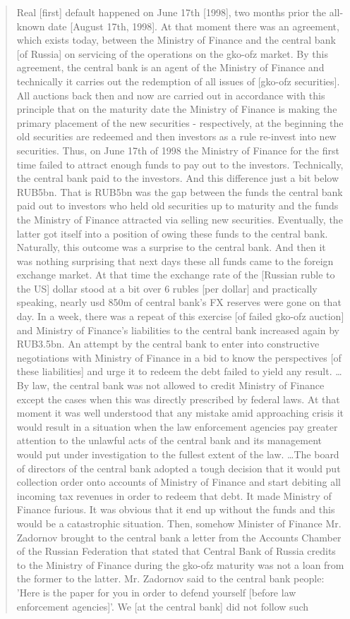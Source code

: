 \begin{quote}
Real [first] default happened on June 17th [1998], two months prior the all-known date [August 17th, 1998]. At that moment there was an agreement, which exists today, between the Ministry of Finance and the central bank [of Russia] on servicing of the operations on the \ac{gko}-\ac{ofz} market. By this agreement, the central bank is an agent of the Ministry of Finance and technically it carries out the redemption of all issues of [\ac{gko}-\ac{ofz} securities]. All auctions back then and now are carried out in accordance with this principle that on the maturity date the Ministry of Finance is making the primary placement of the new securities - respectively, at the beginning the old securities are redeemed and then investors as a rule re-invest into new securities. Thus, on June 17th of 1998 the Ministry of Finance for the first time failed to attract enough funds to pay out to the investors. Technically, the central bank paid to the investors. And this difference just a bit below RUB5bn. That is RUB5bn was the gap between the funds the central bank paid out to investors who held old securities up to maturity and the funds the Ministry of Finance attracted via selling new securities. Eventually, the latter got itself into a position of owing these funds to the central bank. Naturally, this outcome was a surprise to the central bank. And then it was nothing surprising that next days these all funds came to the foreign exchange market. At that time the exchange rate of the [Russian ruble to the US] dollar stood at a bit over 6 rubles [per dollar] and practically speaking, nearly \ac{usd} 850m of central bank's FX reserves were gone on that day. In a week, there was a repeat of this exercise [of failed \ac{gko}-\ac{ofz} auction] and Ministry of Finance's liabilities to the central bank increased again by RUB3.5bn. An attempt by the central bank to enter into constructive negotiations with Ministry of Finance in a bid to know the perspectives [of these liabilities] and urge it to redeem the debt failed to yield any result. \dots By law, the central bank was not allowed to credit Ministry of Finance except the cases when this was directly prescribed by federal laws. At that moment it was well understood that any mistake amid approaching crisis it would result in a situation when the law enforcement agencies pay greater attention to the unlawful acts of the central bank and its management would put under investigation to the fullest extent of the law. \dots The board of directors of the central bank adopted a tough decision that it would put collection order onto accounts of Ministry of Finance and start debiting all incoming tax revenues in order to redeem that debt. It made Ministry of Finance furious. It was obvious that it end up without the funds and this would be a catastrophic situation. Then, somehow Minister of Finance Mr. Zadornov brought to the central bank a letter from the Accounts Chamber of the Russian Federation that stated that Central Bank of Russia credits to the Ministry of Finance during the \ac{gko}-\ac{ofz} maturity was not a loan from the former to the latter. Mr. Zadornov said to the central bank people: 'Here is the paper for you in order to defend yourself [before law enforcement agencies]'. We [at the central bank] did not follow such 
\end{quote}
